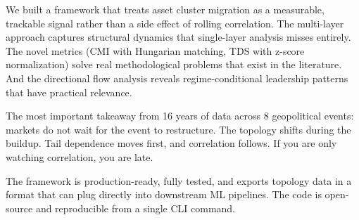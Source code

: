 \documentclass[12pt, letterpaper]{article}
\begin{document}
We built a framework that treats asset cluster migration as a measurable, trackable signal rather than a side effect of rolling correlation. The multi-layer approach captures structural dynamics that single-layer analysis misses entirely. The novel metrics (CMI with Hungarian matching, TDS with z-score normalization) solve real methodological problems that exist in the literature. And the directional flow analysis reveals regime-conditional leadership patterns that have practical relevance.

The most important takeaway from 16 years of data across 8 geopolitical events: markets do not wait for the event to restructure. The topology shifts during the buildup. Tail dependence moves first, and correlation follows. If you are only watching correlation, you are late.

The framework is production-ready, fully tested, and exports topology data in a format that can plug directly into downstream ML pipelines. The code is open-source and reproducible from a single CLI command.
\end{document}
